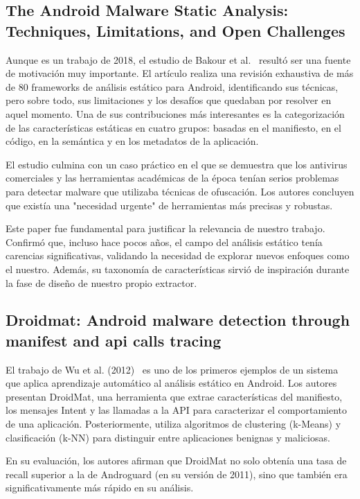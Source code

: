 \subsection{The Android Malware Static Analysis: Techniques, Limitations, and Open Challenges}

Aunque es un trabajo de 2018, el estudio de Bakour et al.~\cite{8566573} resultó ser una fuente de motivación muy importante. El artículo realiza una revisión exhaustiva de más de 80 frameworks de análisis estático para Android, identificando sus técnicas, pero sobre todo, sus limitaciones y los desafíos que quedaban por resolver en aquel momento. Una de sus contribuciones más interesantes es la categorización de las características estáticas en cuatro grupos: basadas en el manifiesto, en el código, en la semántica y en los metadatos de la aplicación.

El estudio culmina con un caso práctico en el que se demuestra que los antivirus comerciales y las herramientas académicas de la época tenían serios problemas para detectar malware que utilizaba técnicas de ofuscación. Los autores concluyen que existía una "necesidad urgente" de herramientas más precisas y robustas.

Este paper fue fundamental para justificar la relevancia de nuestro trabajo. Confirmó que, incluso hace pocos años, el campo del análisis estático tenía carencias significativas, validando la necesidad de explorar nuevos enfoques como el nuestro. Además, su taxonomía de características sirvió de inspiración durante la fase de diseño de nuestro propio extractor.

\subsection{Droidmat: Android malware detection through manifest and api calls tracing}

El trabajo de Wu et al. (2012)~\cite{wu2012droidmat} es uno de los primeros ejemplos de un sistema que aplica aprendizaje automático al análisis estático en Android. Los autores presentan DroidMat, una herramienta que extrae características del manifiesto, los mensajes Intent y las llamadas a la API para caracterizar el comportamiento de una aplicación. Posteriormente, utiliza algoritmos de clustering (k-Means) y clasificación (k-NN) para distinguir entre aplicaciones benignas y maliciosas.

En su evaluación, los autores afirman que DroidMat no solo obtenía una tasa de recall superior a la de Androguard (en su versión de 2011), sino que también era significativamente más rápido en su análisis.


